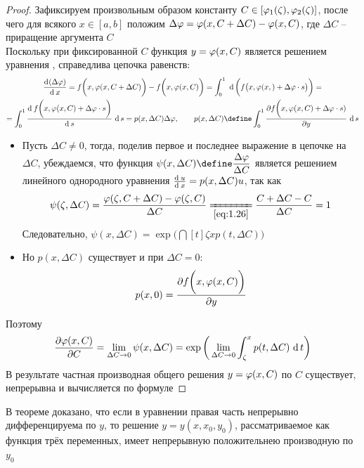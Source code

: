 \begin{proof}
	Зафиксируем произвольным образом константу $ C \in [\vphi_1(\zeta), \vphi_2(\zeta)] $, после чего для всякого $ x \in [a, b] $ положим $ \Delta \vphi = \vphi(x, C + \Delta C) - \vphi(x, C) $, где $ \Delta C $ -- приращение аргумента $ C $ \\
    Поскольку при фиксированной $ C $ функция $ y = \vphi(x, C) $ является решением уравнения , справедлива цепочка равенств:
    \begin{multline*}
        \frac{\di(\Delta \vphi)}{\di x} = f \bigg( x, \vphi(x, C + \Delta C) \bigg) - f \bigg( x, \vphi(x, C) \bigg) = \dint[\bigg( f \big( x, \vphi(x, ) + \Delta \vphi \cdot s \big) \bigg)]01{} = \\
        = \dint[s]01{\frac{\di f \bigg( x, \vphi(x, C) + \Delta \vphi \cdot s \bigg)}{\di s}} = p(x, \Delta C) \Delta \vphi, \qquad p(x, \Delta C) \define \dint[s]01{\pder{f \bigg( x, \vphi(x, C) + \Delta \vphi \cdot s)}y}
    \end{multline*}
    \begin{itemize}
        \item Пусть $ \Delta C \ne 0 $, тогда, поделив первое и последнее выражение в цепочке на $ \Delta C $, убеждаемся, что функция $ \psi(x, \Delta C) \define \dfrac{\Delta \vphi}{\Delta C} $ является решением  линейного однородного уравнения $ \frac{\di u}{\di x} = p(x, \Delta C)u $, так как
        $$ \psi(\zeta, \Delta C) = \frac{\vphi(\zeta, C + \Delta C) - \vphi(\zeta, C)}{\Delta C} \undereq{\eref{1.26}} \frac{C + \Delta C - C}{\Delta C} = 1 $$
        Следовательно, $ \psi(x, \Delta C) = \exp \bigg( \dint[t]\zeta{x}{p(t, \Delta C)} \bigg) $
        \item Но $ p(x, \Delta C) $ существует и при $ \Delta C = 0 $:
        $$ p(x, 0) = \pder{f \bigg( x, \vphi(x, C) \bigg)}y $$
    \end{itemize}
    Поэтому
    $$ \pder{\vphi(x, C)}C = \limz{\Delta C} \psi(x, \Delta C) = \exp \bigg( \limz{\Delta C} \dint[t]\zeta{x}{p(t, \Delta C)} \bigg) $$
    В результате частная производная общего решения $ y = \vphi(x, C) $ по $ C $ существует, непрерывна и вычисляется по формуле 
\end{proof}

\begin{remark}
    В теореме доказано, что если в уравнении  правая часть непрерывно дифференцируема по $ y $, то решение $ y = y(x, x_0, y_0) $, рассматриваемое как функция трёх переменных, имеет непрерывную положительнею производную по $ y_0 $
\end{remark}

